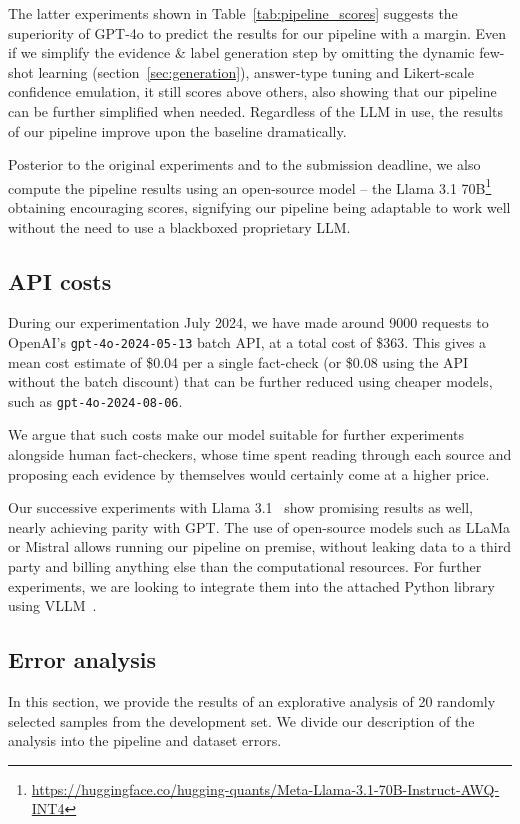 The latter experiments shown in Table~\ref{tab:pipeline_scores} suggests the superiority of GPT-4o to predict the results for our pipeline with a margin.
Even if we simplify the evidence \& label generation step by omitting the dynamic few-shot learning (section~\ref{sec:generation}), answer-type tuning and Likert-scale confidence emulation, it still scores above others, also showing that our pipeline can be further simplified when needed.
Regardless of the LLM in use, the results of our pipeline improve upon the \averitec{} baseline dramatically.

Posterior to the original experiments and to the \averitec{} submission deadline, we also compute the pipeline results using an open-source model -- the Llama 3.1 70B\footnote{\url{https://huggingface.co/hugging-quants/Meta-Llama-3.1-70B-Instruct-AWQ-INT4}}~\cite{dubey2024llama3herdmodels} obtaining encouraging scores, signifying our pipeline being adaptable to work well without the need to use a blackboxed proprietary LLM.

\subsection{API costs}
During our experimentation July 2024, we have made around 9000 requests to OpenAI's \texttt{gpt-4o-2024-05-13} batch API, at a total cost of \$363.
This gives a mean cost estimate of \$0.04 per a single fact-check (or \$0.08 using the API without the batch discount) that can be further reduced using cheaper models, such as \texttt{gpt-4o-2024-08-06}.

We argue that such costs make our model suitable for further experiments alongside human fact-checkers{,} whose time spent reading through each source and proposing each evidence by themselves would certainly come at a higher price.

Our successive experiments with Llama 3.1~\cite{dubey2024llama3herdmodels} show promising results as well, nearly achieving parity with GPT.
The use of open-source models such as LLaMa or Mistral allows running our pipeline on premise, without leaking data to a third party and billing anything else than the computational resources.
For further experiments, we are looking to integrate them into the attached Python library using VLLM~\cite{vllm}.

\subsection{Error analysis}
In this section, we provide the results of an explorative analysis of 20 randomly selected samples from the development set. We divide our description of the analysis into the pipeline and dataset errors.


